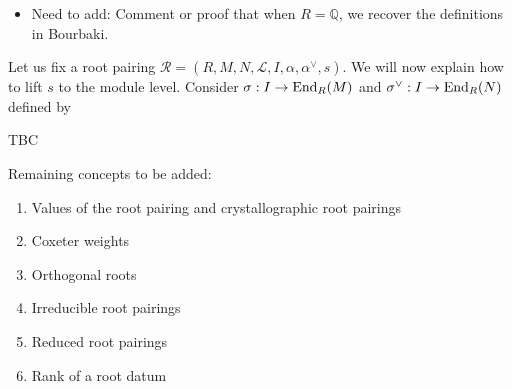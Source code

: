 \begin{itemize}
    \item Need to add: Comment or proof that when $R = \mathbb{Q}$, we recover the definitions in Bourbaki.
\end{itemize}

Let us fix a root pairing $\mathcal{R} = (R,M,N,\mathcal{L},I,\alpha, \alpha^\vee,s)$. We will now 
explain how to lift $s$ to the module level. Consider $\sigma: I \to {\rm End}_R(M)$ and 
$\sigma^\vee : I \to {\rm End}_R(N)$ defined by

TBC

Remaining concepts to be added:
\begin{enumerate}
    \item Values of the root pairing and crystallographic root pairings
    \item Coxeter weights
    \item Orthogonal roots 
    \item Irreducible root pairings
    \item Reduced root pairings
    \item Rank of a root datum 
\end{enumerate}